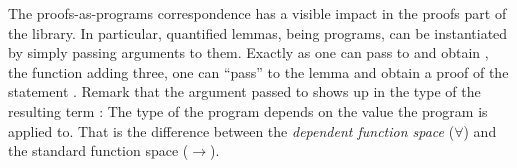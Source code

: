 






The proofs-as-programs correspondence has a visible impact in the proofs
part of the \mcbMC{} library.  In particular, quantified lemmas, being programs,
can be instantiated by simply passing arguments to them.  Exactly as one can
pass  to  and obtain , the function adding three, one
can ``pass''  to the lemma  and obtain a proof of the statement
.  Remark that the argument passed to 
shows up in the type of the resulting term :  The type of the
 program depends on the value the program is applied to.  That is the
difference between the \emph{dependent function space} ($\forall$)
and the standard function space ($\to$).


